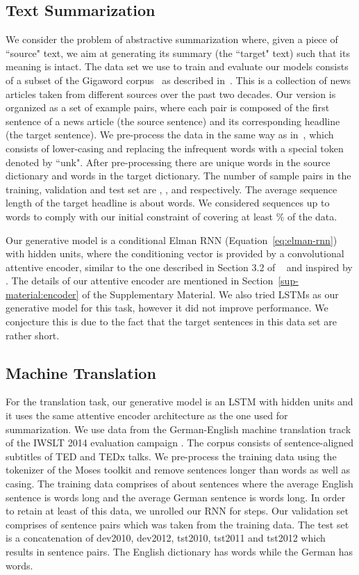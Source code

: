 \documentclass{article} \usepackage{iclr2016_conference,times}
\begin{document}
\subsection{Text Summarization}
We consider the problem of abstractive summarization where, 
given a piece of ``source" text, we aim at generating its summary (the ``target" text)
such that its meaning is intact.  
The data set we use to train and evaluate our models consists of a 
subset of the Gigaword corpus~\citep{gigaword} as described in~\citet{rush-2015}. 
This is a collection of news articles taken from different sources over the past two decades. 
Our version is organized as a set of example pairs, where each pair is composed of the 
first sentence of a news article (the source sentence) and its corresponding headline (the target sentence). 
We pre-process the data in the same way as in~\citep{rush-2015}, which consists of lower-casing 
and replacing the infrequent words with a special token denoted by ``unk". After 
pre-processing there are  unique words in the source dictionary and  words in the target dictionary. The number of sample pairs in the training, validation and test set are , , 
and  respectively. The average sequence length of the target headline is about  words. 
We considered sequences up to  words to comply with our initial constraint of covering at least
\% of the data.

Our generative model is a conditional Elman RNN (Equation~\ref{eq:elman-rnn}) with  hidden units, 
where the conditioning vector   is provided by a convolutional attentive encoder, 
similar to the one described in Section 3.2 of ~\citet{rush-2015} and inspired by 
\cite{bahdanau-iclr2015}. The details of our attentive 
encoder are mentioned in Section~\ref{sup-material:encoder} of the Supplementary Material.
We also tried LSTMs as our generative model for this task, however it did not improve performance. We conjecture this is due to the fact that the target sentences in this data set are rather short.

\subsection{Machine Translation}
For the translation task, our generative model is an LSTM with  hidden units and it uses the same attentive encoder architecture as the one used for summarization. 
We use data from the German-English machine translation track of the
IWSLT 2014 evaluation campaign \citep{cettolo2014}.
The corpus consists of sentence-aligned subtitles of TED and TEDx 
talks. We pre-process the training data using the tokenizer of the Moses 
toolkit \citep{koehn2007} and remove sentences longer than  words as well as casing.  
The training data comprises of about  sentences where the average English 
sentence is  words long and the average German sentence is 
 words long. In order to retain at least  of this data, we unrolled our RNN for  steps.
Our validation set comprises of  sentence pairs which was taken from the training data. The test set is a concatenation of dev2010, dev2012, tst2010, tst2011 and tst2012 
which results in  sentence pairs. The English dictionary has  words while the German has  words. 
\end{document}
